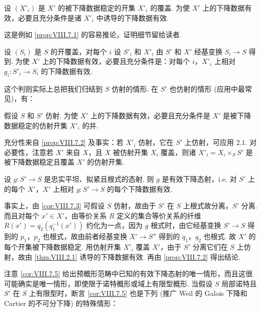 \begin{proposition}\label{prop:VIII.7.2}
设 $(X'_i)$ 是 $X'$ 的被下降数据稳定的开集 $X'_i$ 的覆盖. 为使 $X'$ 上的下降数据有效，必要且充分条件是诸 $X'_i$ 中诱导的下降数据有效.
\end{proposition}

这是例如 \ref{prop:VIII.7.1} 的容易推论，证明细节留给读者.

\begin{corollary}\label{cor:VIII.7.3}
设 $(S_i)$ 是 $S$ 的开覆盖，对每个 $i$ 设 $S'_i$ 和 $X'_i$ 由 $S'$ 和 $X'$ 经基变换 $S_i \to S$ 得到. 为使 $X'$ 上的下降数据有效，必要且充分条件是：对每个 $i$，$X'_i$ 上相对 $g_i \colon S'_i \to S_i$ 的下降数据有效.
\end{corollary}

这个判则实际上总把我们归结到 $S$ 仿射的情形. 在 $S'$ 也仿射的情形 (应用中最常见)，有：

\begin{corollary}\label{cor:VIII.7.4}
假设 $S$ 和 $S'$ 仿射. 为使 $X'$ 上的下降数据有效，必要且充分条件是 $X'$ 是被下降数据稳定的仿射开集 $X'_i$ 的并.
\end{corollary}

充分性来自 \ref{prop:VIII.7.2} 及事实：若 $X'_i$ 仿射，它在 $S'$ 上仿射，可应用 2.1. 对必要性，注意若 $X'$ 来自 $X$，且 $X$ 被仿射开集 $X_i$ 覆盖，则诸 $X'_i = X_i \times_S S'$ 是被下降数据稳定且覆盖 $X'$ 的仿射开集.

\begin{corollary}\label{cor:VIII.7.5}
设 $g \colon S' \to S$ 是忠实平坦、拟紧且根式的态射. 则 $g$ 是有效下降态射，i.e. 对 $S'$ 上的每个 $X'$，$X'$ 上相对 $g \colon S' \to S$ 的每个下降数据有效.
\end{corollary}

事实上，由 \ref{cor:VIII.7.3} 可假设 $S$ 仿射，故由于 $S'$ 在 $S$ 上根式故分离，$S'$ 分离. 而且对每个 $x' \in X'$，由等价关系 $R$ 定义的集合等价关系的纤维 $R(x') = q_2(q_1^{-1}(x'))$ 约化为一点，因为 $g$ 根式时，由它经基变换 $S' \to S$ 得到的 $p_1$，$p_2$ 也根式，故由前者经基变换 $X' \to S''$ 得到的 $q_1$，$q_2$ 也根式. 故 $X'$ 的每个开集被下降数据稳定. 用仿射开集 $X'_i$ 覆盖 $X'$，由于 $S'$ 分离它们在 $S$ 上仿射，故由 \ref{thm:VIII.2.1} 诱导的下降数据有效. 再由 \ref{prop:VIII.7.2} 得出结论.

注意 \ref{cor:VIII.7.5} 给出预概形范畴中已知的有效下降态射的唯一情形，而且这很可能确实是唯一情形，即使限于诺特概形或域上有限型概形. 当假设 $S$ 局部诺特且 $S'$ 在 $S$ 上有限型时，断言 \ref{cor:VIII.7.5} 也是下列 (推广 Weil 的 Galois 下降和 Cartier 的不可分下降) 的特殊情形：

